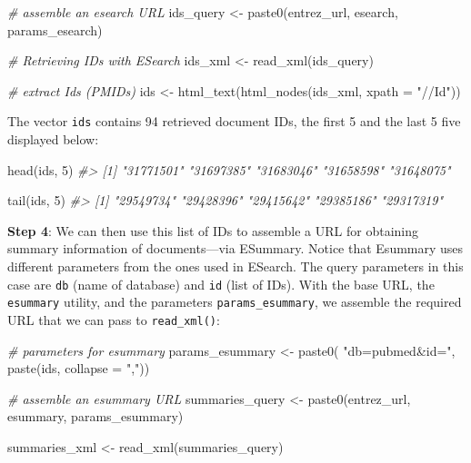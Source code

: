 \documentclass[
]{book}
\newenvironment{Shaded}{\begin{snugshade}}{\end{snugshade}}
\newcommand{\AttributeTok}[1]{\textcolor[rgb]{0.77,0.63,0.00}{#1}}
\newcommand{\CommentTok}[1]{\textcolor[rgb]{0.56,0.35,0.01}{\textit{#1}}}
\newcommand{\DecValTok}[1]{\textcolor[rgb]{0.00,0.00,0.81}{#1}}
\newcommand{\FunctionTok}[1]{\textcolor[rgb]{0.00,0.00,0.00}{#1}}
\newcommand{\NormalTok}[1]{#1}
\newcommand{\OtherTok}[1]{\textcolor[rgb]{0.56,0.35,0.01}{#1}}
\newcommand{\StringTok}[1]{\textcolor[rgb]{0.31,0.60,0.02}{#1}}
\begin{document}
\begin{Shaded}
\begin{Highlighting}[]
\CommentTok{\# assemble an esearch URL}
\NormalTok{ids\_query }\OtherTok{\textless{}{-}} \FunctionTok{paste0}\NormalTok{(entrez\_url, esearch, params\_esearch)}

\CommentTok{\# Retrieving IDs with ESearch}
\NormalTok{ids\_xml }\OtherTok{\textless{}{-}} \FunctionTok{read\_xml}\NormalTok{(ids\_query)}

\CommentTok{\# extract Ids (PMIDs)}
\NormalTok{ids }\OtherTok{\textless{}{-}} \FunctionTok{html\_text}\NormalTok{(}\FunctionTok{html\_nodes}\NormalTok{(ids\_xml, }\AttributeTok{xpath =} \StringTok{"//Id"}\NormalTok{))}
\end{Highlighting}
\end{Shaded}

The vector \texttt{ids} contains 94 retrieved document IDs, the first
5 and the last 5 five displayed below:

\begin{Shaded}
\begin{Highlighting}[]
\FunctionTok{head}\NormalTok{(ids, }\DecValTok{5}\NormalTok{)}
\CommentTok{\#\textgreater{} [1] "31771501" "31697385" "31683046" "31658598" "31648075"}

\FunctionTok{tail}\NormalTok{(ids, }\DecValTok{5}\NormalTok{)}
\CommentTok{\#\textgreater{} [1] "29549734" "29428396" "29415642" "29385186" "29317319"}
\end{Highlighting}
\end{Shaded}

\textbf{Step 4}: We can then use this list of IDs to assemble a URL for obtaining
summary information of documents---via ESummary. Notice that Esummary uses
different parameters from the ones used in ESearch. The query parameters in
this case are \texttt{db} (name of database) and \texttt{id} (list of IDs). With the base URL,
the \texttt{esummary} utility, and the parameters \texttt{params\_esummary}, we assemble the
required URL that we can pass to \texttt{read\_xml()}:

\begin{Shaded}
\begin{Highlighting}[]
\CommentTok{\# parameters for esummary}
\NormalTok{params\_esummary }\OtherTok{\textless{}{-}} \FunctionTok{paste0}\NormalTok{(}
  \StringTok{"db=pubmed\&id="}\NormalTok{, }
  \FunctionTok{paste}\NormalTok{(ids, }\AttributeTok{collapse =} \StringTok{","}\NormalTok{))}

\CommentTok{\# assemble an esummary URL}
\NormalTok{summaries\_query }\OtherTok{\textless{}{-}} \FunctionTok{paste0}\NormalTok{(entrez\_url, esummary, params\_esummary)}

\NormalTok{summaries\_xml }\OtherTok{\textless{}{-}} \FunctionTok{read\_xml}\NormalTok{(summaries\_query)}
\end{Highlighting}
\end{Shaded}
\end{document}
